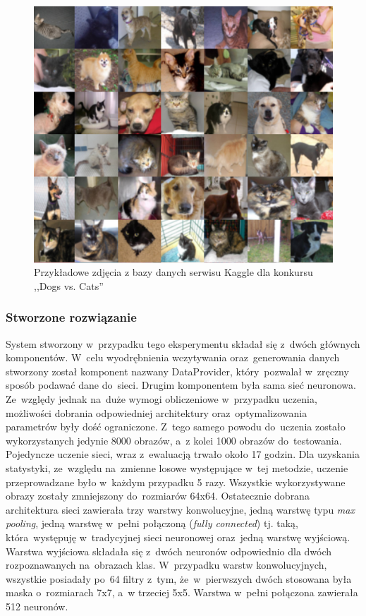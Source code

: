 \begin{figure}[ht!]
\centering
\includegraphics[scale=0.8]{res/catsdogs.png}
\caption[Caption for LOF]{Przykładowe zdjęcia z bazy danych serwisu Kaggle dla konkursu ,,Dogs vs. Cats'' \label{catsdogs}}
\end{figure} 

\subsubsection{Stworzone rozwiązanie}
System stworzony w~przypadku tego eksperymentu składał się z~dwóch głównych komponentów. W~celu wyodrębnienia wczytywania oraz~generowania danych stworzony został komponent nazwany DataProvider, który~pozwalał w~zręczny sposób podawać dane do~sieci. Drugim komponentem była sama sieć neuronowa. Ze~względy jednak na~duże wymogi obliczeniowe w~przypadku uczenia, możliwości dobrania odpowiedniej architektury oraz~optymalizowania parametrów były dość ograniczone. Z~tego samego powodu do~uczenia zostało wykorzystanych jedynie 8000 obrazów, a~z kolei 1000 obrazów do~testowania. Pojedyncze uczenie sieci, wraz z~ewaluacją trwało około 17 godzin. Dla uzyskania statystyki, ze~względu na~zmienne losowe występujące w~tej metodzie, uczenie przeprowadzane było w~każdym przypadku 5 razy. Wszystkie wykorzystywane obrazy zostały zmniejszony do~rozmiarów 64x64. Ostatecznie dobrana architektura sieci zawierała trzy warstwy konwolucyjne, jedną warstwę typu \textit{max pooling}, jedną warstwę w~pełni połączoną (\textit{fully connected}) tj. taką, która~występuję w~tradycyjnej sieci neuronowej oraz~jedną warstwę wyjściową. Warstwa wyjściowa składała się z~dwóch neuronów odpowiednio dla dwóch rozpoznawanych na~obrazach klas. W~przypadku warstw konwolucyjnych, wszystkie posiadały po~64 filtry z~tym, że~w~pierwszych dwóch stosowana była maska o~rozmiarach 7x7, a~w trzeciej 5x5.  Warstwa w~pełni połączona zawierała 512 neuronów.
